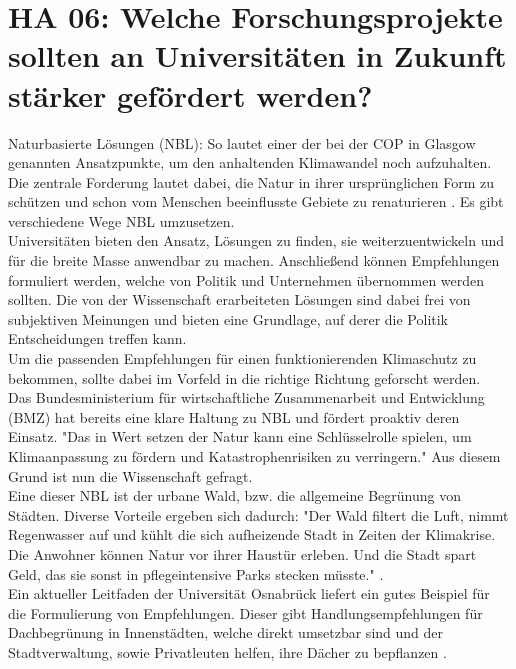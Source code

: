 \section{HA 06: Welche Forschungsprojekte sollten an Universitäten in Zukunft stärker gefördert werden?}
  Naturbasierte Lösungen (NBL): So lautet einer der bei der COP in Glasgow genannten Ansatzpunkte, um den anhaltenden Klimawandel noch aufzuhalten. Die zentrale Forderung lautet dabei, die Natur in ihrer ursprünglichen Form zu schützen und schon vom Menschen beeinflusste Gebiete zu renaturieren \cite{wahnbaeck_nature-based_2021}. Es gibt verschiedene Wege NBL umzusetzen.\\
  Universitäten bieten den Ansatz, Lösungen zu finden, sie weiterzuentwickeln und für die breite Masse anwendbar zu machen. Anschließend können Empfehlungen formuliert werden, welche von Politik und Unternehmen übernommen werden sollten. Die von der Wissenschaft erarbeiteten Lösungen sind dabei frei von subjektiven Meinungen und bieten eine Grundlage, auf derer die Politik Entscheidungen treffen kann.\\
  Um die passenden Empfehlungen für einen funktionierenden Klimaschutz zu bekommen, sollte dabei im Vorfeld in die richtige Richtung geforscht werden.\\
  Das Bundesministerium für wirtschaftliche Zusammenarbeit und Entwicklung (BMZ) hat bereits eine klare Haltung zu NBL und fördert proaktiv deren Einsatz. "Das in Wert setzen der Natur kann eine Schlüsselrolle spielen, um Klimaanpassung zu fördern und Katastrophenrisiken zu verringern." \cite{bundesministerium_fur_wirtschaftliche_zusammenarbeit_und_entwicklung_naturbasierte_2021} Aus diesem Grund ist nun die Wissenschaft gefragt.\\
  Eine dieser NBL ist der urbane Wald, bzw. die allgemeine Begrünung von Städten. Diverse Vorteile ergeben sich dadurch: "Der Wald filtert die Luft, nimmt Regenwasser auf und kühlt die sich aufheizende Stadt in Zeiten der Klimakrise. Die Anwohner können Natur vor ihrer Haustür erleben. Und die Stadt spart Geld, das sie sonst in pflegeintensive Parks stecken müsste." \cite{wahnbaeck_nature-based_2021}.\\
  Ein aktueller Leitfaden der Universität Osnabrück liefert ein gutes Beispiel für die Formulierung von Empfehlungen. Dieser gibt Handlungsempfehlungen für Dachbegrünung in Innenstädten, welche direkt umsetzbar sind und der Stadtverwaltung, sowie Privatleuten helfen, ihre Dächer zu bepflanzen \cite{schroder_extensive_2020}.\\
